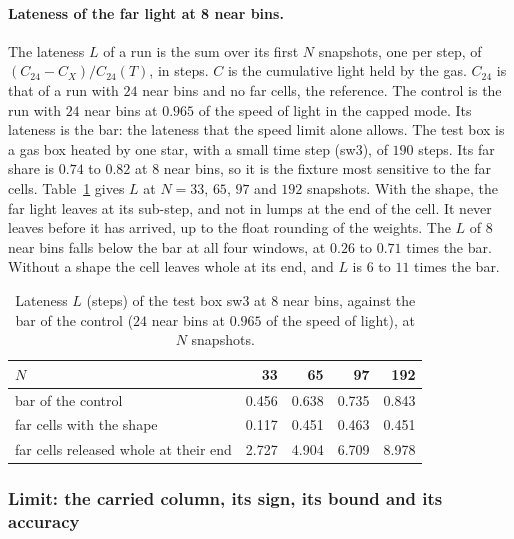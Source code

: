 \paragraph{Lateness of the far light at 8 near bins.} The lateness $L$ of a
run is the sum over its first $N$ snapshots, one per step, of
$(C_{24}-C_X)/C_{24}(T)$, in steps. $C$ is the cumulative light held by the gas.
$C_{24}$ is that of a run with $24$ near bins and no far cells, the
reference. The control is the run with $24$ near bins at $0.965$ of the speed of
light in the capped mode. Its lateness is the bar: the lateness that the
speed limit alone allows. The test box is a gas box heated by one star, with a
small time step (sw3), of $190$ steps. Its far share is $0.74$ to $0.82$ at $8$ near bins, so
it is the fixture most sensitive to the far cells. Table~\ref{tab:isrf-far-lateness}
gives $L$ at $N=33$, $65$, $97$ and $192$ snapshots. With the shape, the far
light leaves at its sub-step, and not in lumps at the end of the cell. It never
leaves before it has arrived, up to the float rounding of the weights. The
$L$ of $8$ near bins falls below the bar at all four windows, at $0.26$ to
$0.71$ times the bar. Without a shape the cell leaves whole at its end, and $L$ is $6$ to $11$ times the bar.

\begin{table}[htbp]
\centering
\caption{Lateness $L$ (steps) of the test box sw3 at $8$ near bins, against the
bar of the control ($24$ near bins at $0.965$ of the speed of light), at $N$ snapshots.}
\label{tab:isrf-far-lateness}
\begin{tabular}{lrrrr}
\toprule
$N$ & 33 & 65 & 97 & 192 \\
\midrule
bar of the control & 0.456 & 0.638 & 0.735 & 0.843 \\
far cells with the shape & 0.117 & 0.451 & 0.463 & 0.451 \\
far cells released whole at their end & 2.727 & 4.904 & 6.709 & 8.978 \\
\bottomrule
\end{tabular}
\end{table}

\subsubsection{Limit: the carried column, its sign, its bound and its accuracy}
\label{sec:packet-h2-limits}

